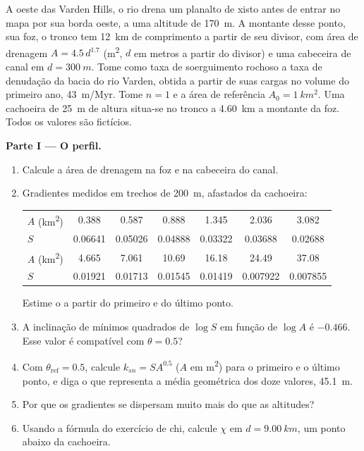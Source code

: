 \begin{problem}
\label{pb:b3:quantitative-geomorphology:1}
A oeste das Varden Hills, o rio drena um planalto de xisto antes de
entrar no mapa por sua borda oeste, a uma altitude de \qty{170}{m}. A montante
desse ponto, sua foz, o tronco tem \qty{12}{km} de comprimento a partir de seu divisor,
com área de drenagem $A = 4.5\,d^{1.7}$ (\unit{m^2}, $d$ em metros a partir do
divisor) e uma cabeceira de canal em $d = \qty{300}{m}$. Tome como taxa de
soerguimento rochoso a taxa de denudação da bacia do rio Varden, obtida a partir de suas cargas
no volume do primeiro ano, \qty{43}{m/Myr}. Tome $n = 1$ e a área de referência $A_0 = \qty{1}{km^2}$.
Uma cachoeira de \qty{25}{m} de altura situa-se no tronco a \qty{4.60}{km} a montante
da foz. Todos os valores são fictícios.

\medskip\noindent\textbf{Parte I --- O perfil.}
\begin{enumerate}
\item Calcule a área de drenagem na foz e na cabeceira do canal.
\item Gradientes medidos em trechos de \qty{200}{m}, afastados da
  cachoeira:

  \smallskip
  {\small\begin{tabular}{l*{6}{c}}
  $A$ (\unit{km^2}) & 0.388 & 0.587 & 0.888 & 1.345 & 2.036 & 3.082 \\
  $S$ & 0.06641 & 0.05026 & 0.04888 & 0.03322 & 0.03688 & 0.02688 \\[2pt]
  $A$ (\unit{km^2}) & 4.665 & 7.061 & 10.69 & 16.18 & 24.49 & 37.08 \\
  $S$ & 0.01921 & 0.01713 & 0.01545 & 0.01419 & 0.007922 & 0.007855
  \end{tabular}}

  \smallskip
  Estime o  a partir do primeiro e do último ponto.
\item A inclinação de mínimos quadrados de $\log S$ em função de $\log A$ é $-0.466$.
  Esse valor é compatível com $\theta = 0.5$?
\item Com $\theta_{\mathrm{ref}} = 0.5$, calcule $k_{sn} = S A^{0.5}$ ($A$ em
  \unit{m^2}) para o primeiro e o último ponto, e diga o que representa a
  média geométrica dos doze valores, \qty{45.1}{m}.
\item Por que os gradientes se dispersam muito mais do que as altitudes?
\item Usando a fórmula do exercício de chi, calcule $\chi$ em $d =
  \qty{9.00}{km}$, um ponto abaixo da cachoeira.
\end{enumerate}


\end{problem}
